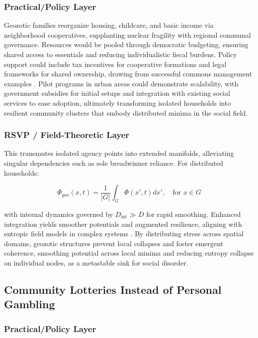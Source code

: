 \documentclass[11pt]{article}
\begin{document}
\subsubsection{Practical/Policy Layer}

Geozotic families reorganize housing, childcare, and basic income via neighborhood cooperatives, supplanting nuclear fragility with regional communal governance. Resources would be pooled through democratic budgeting, ensuring shared access to essentials and reducing individualistic fiscal burdens. Policy support could include tax incentives for cooperative formations and legal frameworks for shared ownership, drawing from successful commons management examples \citep{ostrom1990governing}. Pilot programs in urban areas could demonstrate scalability, with government subsidies for initial setups and integration with existing social services to ease adoption, ultimately transforming isolated households into resilient community clusters that embody distributed minima in the social field.

\subsubsection{RSVP / Field-Theoretic Layer}

This transmutes isolated agency points into extended manifolds, alleviating singular dependencies such as sole breadwinner reliance. For distributed households:

\begin{equation}
\Phi_{\text{geo}}(x, t) = \frac{1}{|G|} \int_G \Phi(x', t)  dx', \quad \text{for } x \in G
\end{equation}

with internal dynamics governed by $D_{\text{int}} \gg D$ for rapid smoothing. Enhanced integration yields smoother potentials and augmented resilience, aligning with entropic field models in complex systems \citep{gellmann1994quark, bertacca2025entropic}. By distributing stress across spatial domains, geozotic structures prevent local collapses and foster emergent coherence, smoothing potential across local minima and reducing entropy collapse on individual nodes, as a metastable sink for social disorder.

\subsection{Community Lotteries Instead of Personal Gambling}

\subsubsection{Practical/Policy Layer}
\end{document}
